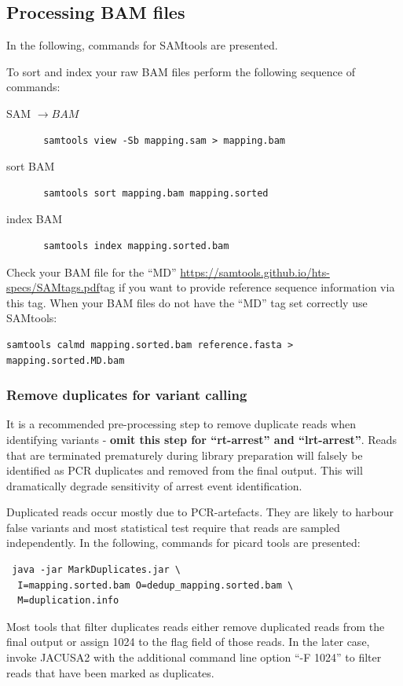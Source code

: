 \documentclass[10pt,a4paper]{article}
\begin{document}
\subsection{Processing BAM files}
In the following, commands for SAMtools are presented.

To sort and index your raw BAM files perform the following sequence of commands:
\begin{description}
\item[SAM $\rightarrow BAM$] \begin{verbatim} samtools view -Sb mapping.sam > mapping.bam \end{verbatim}
\item[sort BAM] \begin{verbatim} samtools sort mapping.bam mapping.sorted \end{verbatim} 
\item[index BAM] \begin{verbatim} samtools index mapping.sorted.bam \end{verbatim}
\end{description}

Check your BAM file for the ``MD'' \url{https://samtools.github.io/hts-specs/SAMtags.pdf}{tag} 
if you want to provide reference sequence information via this tag. 
When your BAM files do not have the ``MD'' tag set correctly use SAMtools:
\begin{verbatim}
samtools calmd mapping.sorted.bam reference.fasta > mapping.sorted.MD.bam
\end{verbatim}
\subsubsection{Remove duplicates for variant calling}
It is a recommended pre-processing step to remove duplicate reads when identifying variants - \textbf{omit 
this step for ``rt-arrest'' and ``lrt-arrest''}. Reads that are terminated prematurely during 
library preparation will falsely be identified as PCR duplicates and removed from the final output. 
This will dramatically degrade sensitivity of arrest event identification.

Duplicated reads occur mostly due to PCR-artefacts. They are likely to harbour false variants and 
most statistical test require that reads are sampled independently.
In the following, commands for picard tools are presented:
\begin{verbatim} java -jar MarkDuplicates.jar \ 
  I=mapping.sorted.bam O=dedup_mapping.sorted.bam \ 
  M=duplication.info
\end{verbatim}
Most tools that filter duplicates reads either remove duplicated reads from the final output or assign 1024 
to the flag field of those reads. In the later case, invoke JACUSA2 with the additional command line 
option ``-F 1024'' to filter reads that have been marked as duplicates.
\end{document}
